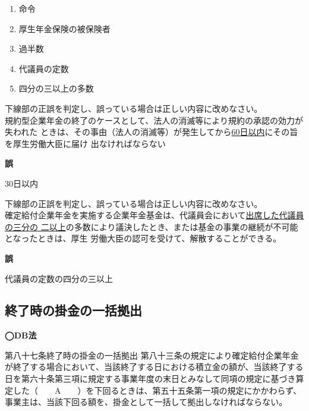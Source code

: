 \begin{answerbox}
  \begin{enumerate}[A: ]
    \item 命令
    \item 厚生年金保険の被保険者
    \item 過半数
    \item 代議員の定数
    \item 四分の三以上の多数
  \end{enumerate}
\end{answerbox}


\begin{truefalse}[年金1 2018 問題1(1)\textcircled{5}]
  下線部の正誤を判定し、誤っている場合は正しい内容に改めなさい。
  \\

  規約型企業年金の終了のケースとして、法人の消滅等により規約の承認の効力が失われた
ときは、その事由（法人の消滅等）が発生してから\underline{60日以内}にその旨を厚生労働大臣に届け
出なければならない
\end{truefalse}

\begin{answerbox}
  \textbf{誤}

  30日以内
\end{answerbox}

\begin{truefalse}[年金2 2020 問題1(1)\textcircled{1}]
  下線部の正誤を判定し、誤っている場合は正しい内容に改めなさい。
  \\

  確定給付企業年金を実施する企業年金基金は、代議員会において\underline{出席した代議員の三分の
二以上}の多数により議決したとき、または基金の事業の継続が不可能となったときは、厚生
労働大臣の認可を受けて、解散することができる。
\end{truefalse}


\begin{answerbox}
  \textbf{誤}

  代議員の定数の四分の三以上
\end{answerbox}

\newpage

\subsection{終了時の掛金の一括拠出}

\begin{fillblank}[数理人試験 H30 問題1 設問1 F]
  \noindent \textbf{◯DB法}
  \begin{lawstructure}
    \begin{lawarticle}{第八十七条}{終了時の掛金の一括拠出}
      第八十三条の規定により確定給付企業年金が終了する場合において、当該終了する日における積立金の額が、当該終了する日を第六十条第三項に規定する事業年度の末日とみなして同項の規定に基づき算定した（　　A　　）を下回るときは、第五十五条第一項の規定にかかわらず、事業主は、当該下回る額を、掛金として一括して拠出しなければならない。
    \end{lawarticle}
  \end{lawstructure}
\end{fillblank}



